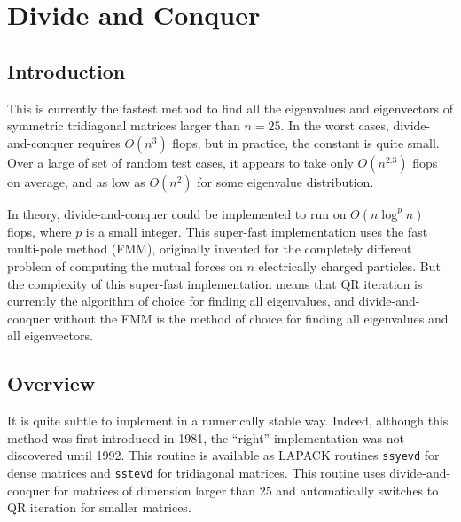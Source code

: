 \message{ !name(eigen-system.tex)}\documentclass{article}
\begin{document}

\maketitle
\thispagestyle{firstpage} 

\section{Divide and Conquer}
\label{sec:divide-conquer}
\subsection{Introduction}
This is currently the fastest method to find all the eigenvalues and
eigenvectors of symmetric tridiagonal matrices larger than $n = 25$.
In the worst cases, divide-and-conquer requires $O(n^3)$ flops, but in
practice, the constant is quite small. 
Over a large of set of random test cases, it appears to take only
$O(n^{2.3})$ flops on average, and as low as $O(n^2)$ for some eigenvalue
distribution.

In theory, divide-and-conquer could be implemented to run on $O(n\log^pn)$
flops, where $p$ is a small integer. This super-fast implementation uses
the fast multi-pole method (FMM), originally invented for the completely
different problem of computing the mutual forces on $n$ electrically
charged particles.
But the complexity of this super-fast implementation means that QR
iteration is currently the algorithm of choice for finding all eigenvalues,
and divide-and-conquer without the FMM is the method of choice for finding
all eigenvalues and all eigenvectors.

\subsection{Overview}
It is quite subtle to implement in a numerically stable way. Indeed,
although this method was first introduced in 1981, the ``right''
implementation was not discovered until 1992.  This routine is available as
LAPACK routines \texttt{ssyevd} for dense matrices and \texttt{sstevd} for
tridiagonal matrices.  This routine uses divide-and-conquer for matrices of
dimension larger than 25 and automatically switches to QR iteration for
smaller matrices.
\end{document}
